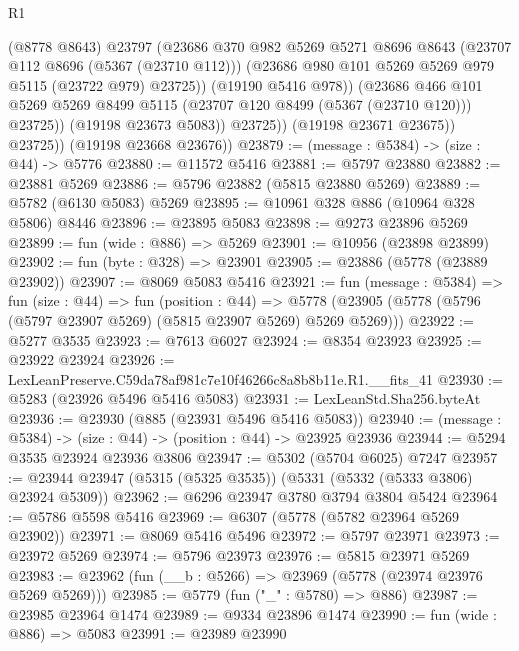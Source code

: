 \begin{lexlean}{R1}
\begin{coremodule}
                      (@8778 @8643)
                      @23797
                      (@23686
                        @370
                        @982
                        @5269
                        @5271
                        @8696
                        @8643
                        (@23707 @112 @8696 (@5367 (@23710 @112)))
                        (@23686 @980 @101 @5269 @5269 @979 @5115 (@23722 @979) @23725))
                      (@19190 @5416 @978))
                    (@23686
                      @466
                      @101
                      @5269
                      @5269
                      @8499
                      @5115
                      (@23707 @120 @8499 (@5367 (@23710 @120)))
                      @23725))
                  (@19198 @23673 @5083))
                @23725))
            (@19198 @23671 @23675))
          @23725))
      (@19198 @23668 @23676))
@23879 := (message : @5384) -> (size : @44) -> @5776
@23880 := @11572 @5416
@23881 := @5797 @23880
@23882 := @23881 @5269
@23886 := @5796 @23882 (@5815 @23880 @5269)
@23889 := @5782 (@6130 @5083) @5269
@23895 := @10961 @328 @886 (@10964 @328 @5806) @8446
@23896 := @23895 @5083
@23898 := @9273 @23896 @5269
@23899 := fun (wide : @886) => @5269
@23901 := @10956 (@23898 @23899)
@23902 := fun (byte : @328) => @23901
@23905 := @23886 (@5778 (@23889 @23902))
@23907 := @8069 @5083 @5416
@23921 := fun (message : @5384) =>
  fun (size : @44) =>
  fun (position : @44) =>
  @5778 (@23905 (@5778 (@5796 (@5797 @23907 @5269) (@5815 @23907 @5269) @5269 @5269)))
@23922 := @5277 @3535
@23923 := @7613 @6027
@23924 := @8354 @23923
@23925 := @23922 @23924
@23926 := LexLeanPreserve.C59da78af981c7e10f46266c8a8b8b11e.R1.__fits_41
@23930 := @5283 (@23926 @5496 @5416 @5083)
@23931 := LexLeanStd.Sha256.byteAt
@23936 := @23930 (@885 (@23931 @5496 @5416 @5083))
@23940 := (message : @5384) -> (size : @44) -> (position : @44) -> @23925 @23936
@23944 := @5294 @3535 @23924 @23936 @3806
@23947 := @5302 (@5704 @6025) @7247
@23957 := @23944 @23947 (@5315 (@5325 @3535)) (@5331 (@5332 (@5333 @3806) @23924 @5309))
@23962 := @6296 @23947 @3780 @3794 @3804 @5424
@23964 := @5786 @5598 @5416
@23969 := @6307 (@5778 (@5782 @23964 @5269 @23902))
@23971 := @8069 @5416 @5496
@23972 := @5797 @23971
@23973 := @23972 @5269
@23974 := @5796 @23973
@23976 := @5815 @23971 @5269
@23983 := @23962 (fun (__b : @5266) => @23969 (@5778 (@23974 @23976 @5269 @5269)))
@23985 := @5779 (fun ("_" : @5780) => @886)
@23987 := @23985 @23964 @1474
@23989 := @9334 @23896 @1474
@23990 := fun (wide : @886) => @5083
@23991 := @23989 @23990

\end{coremodule}
\end{lexlean}
